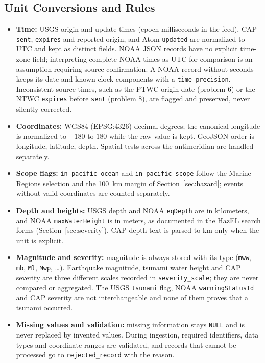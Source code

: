 \documentclass[a4paper,11pt,oneside]{book}
\begin{document}
\subsection{Unit Conversions and Rules}
\begin{itemize}[nosep]
  \item \textbf{Time:} USGS origin and update times (epoch milliseconds in the feed), CAP \texttt{sent}, \texttt{expires} and reported origin, and Atom \texttt{updated} are normalized to UTC and kept as distinct fields. NOAA JSON records have no explicit time-zone field; interpreting complete NOAA times as UTC for comparison is an assumption requiring source confirmation. A NOAA record without seconds keeps its date and known clock components with a \texttt{time\_precision}. Inconsistent source times, such as the PTWC origin date (problem 6) or the NTWC \texttt{expires} before \texttt{sent} (problem 8), are flagged and preserved, never silently corrected.
  \item \textbf{Coordinates:} WGS84 (EPSG:4326) decimal degrees; the canonical longitude is normalized to $-180$ to $180$ while the raw value is kept. GeoJSON order is longitude, latitude, depth. Spatial tests across the antimeridian are handled separately.
  \item \textbf{Scope flags:} \texttt{in\_pacific\_ocean} and \texttt{in\_pacific\_scope} follow the Marine Regions selection and the 100~km margin of Section~\ref{sec:hazard}; events without valid coordinates are counted separately.
  \item \textbf{Depth and heights:} USGS depth and NOAA \texttt{eqDepth} are in kilometers, and NOAA \texttt{maxWaterHeight} is in meters, as documented in the HazEL search forms (Section~\ref{sec:severity}). CAP depth text is parsed to km only when the unit is explicit.
  \item \textbf{Magnitude and severity:} magnitude is always stored with its type (\texttt{mww}, \texttt{mb}, \texttt{Ml}, \texttt{Mwp}, \ldots). Earthquake magnitude, tsunami water height and CAP severity are three different scales recorded in \texttt{severity\_scale}; they are never compared or aggregated. The USGS \texttt{tsunami} flag, NOAA \texttt{warningStatusId} and CAP severity are not interchangeable and none of them proves that a tsunami occurred.
  \item \textbf{Missing values and validation:} missing information stays \texttt{NULL} and is never replaced by invented values. During ingestion, required identifiers, data types and coordinate ranges are validated, and records that cannot be processed go to \texttt{rejected\_record} with the reason.

\end{itemize}
\end{document}
